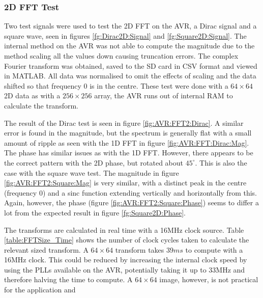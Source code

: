 \subsubsection{2D FFT Test}

Two test signals were used to test the 2D FFT on the AVR, a Dirac signal and a square wave, seen in figures \ref{fg:Dirac2D:Signal} and \ref{fg:Square2D:Signal}. The internal method on the AVR was not able to compute the magnitude due to the method scaling all the values down causing truncation errors. The complex Fourier transform was obtained, saved to the SD card in CSV format and viewed in MATLAB. All data was normalised to omit the effects of scaling and the data shifted so that frequency 0 is in the centre. These test were done with a $64\times64$ 2D data as with a $256 \times 256$ array, the AVR runs out of internal RAM to calculate the transform. 

The result of the Dirac test is seen in figure \ref{fig:AVR:FFT2:Dirac}. A similar error is found in the magnitude, but the spectrum is generally flat with a small amount of ripple as seen with the 1D FFT in figure \ref{fig:AVR:FFT:Dirac:Mag}. The phase has similar issues as with the 1D FFT. However, there appears to be the correct pattern with the 2D phase, but rotated about $45^{\circ}$. This is also the case with the square wave test. The magnitude in figure \ref{fig:AVR:FFT2:Square:Mag} is very similar, with a distinct peak in the centre (frequency 0) and a sinc function extending vertically and horizontally from this. Again, however, the phase (figure \ref{fig:AVR:FFT2:Square:Phase}) seems to differ a lot from the expected result in figure \ref{fg:Square2D:Phase}. 

The transforms are calculated in real time with a 16MHz clock source. Table \ref{table:FFTSize_Time} shows the number of clock cycles taken to calculate the relevant sized transform. A $64 \times 64$ transform takes $39ms$ to compute with a 16MHz clock. This could be reduced by increasing the internal clock speed by using the PLLs available on the AVR, potentially taking it up to 33MHz and therefore halving the time to compute. A $64 \times 64$ image, however, is not practical for the application and 

